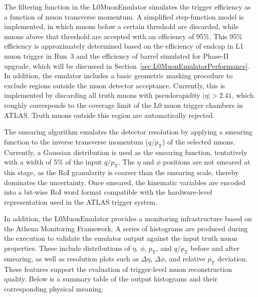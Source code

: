 The filtering function in the L0MuonEmulator simulates the trigger efficiency as a function of muon transverse momentum. A simplified step-function model is implemented, in which muons below a certain threshold are discarded, while muons above that threshold are accepted with an efficiency of 95\%. This 95\% efficiency is approximately determined based on the efficiency of endcap in L1 muon trigger in Run~3 and the efficiency of barrel simulated for Phase-II upgrade, which will be discussed in Section~\ref{sec:L0MuonEmulatorPerformance}. In addition, the emulator includes a basic geometric masking procedure to exclude regions outside the muon detector acceptance. Currently, this is implemented by discarding all truth muons with pseudorapidity $|\eta| > 2.41$, which roughly corresponds to the coverage limit of the L0 muon trigger chambers in ATLAS. Truth muons outside this region are automatically rejected.

The smearing algorithm emulates the detector resolution by applying a smearing function to the inverse transverse momentum ($q/p_\mathrm{T}$) of the selected muons. Currently, a Gaussian distribution is used as the smearing function, tentatively with a width of 5\% of the input $q/p_\mathrm{T}$. The $\eta$ and $\phi$ positions are not smeared at this stage, as the RoI granularity is coarser than the smearing scale, thereby dominates the uncertainty. Once smeared, the kinematic variables are encoded into a bit-wise RoI word format compatible with the hardware-level representation used in the ATLAS trigger system.

In addition, the L0MuonEmulator provides a monitoring infrastructure based on the Athena Monitoring Framework. A series of histograms are produced during the execution to validate the emulator output against the input truth muon properties. These include distributions of $\eta$, $\phi$, $p_\mathrm{T}$, and $q/p_\mathrm{T}$ before and after smearing, as well as resolution plots such as $\Delta\eta$, $\Delta\phi$, and relative $p_\mathrm{T}$ deviation. These features support the evaluation of trigger-level muon reconstruction quality. Below is a summary table of the output histograms and their corresponding physical meaning.



